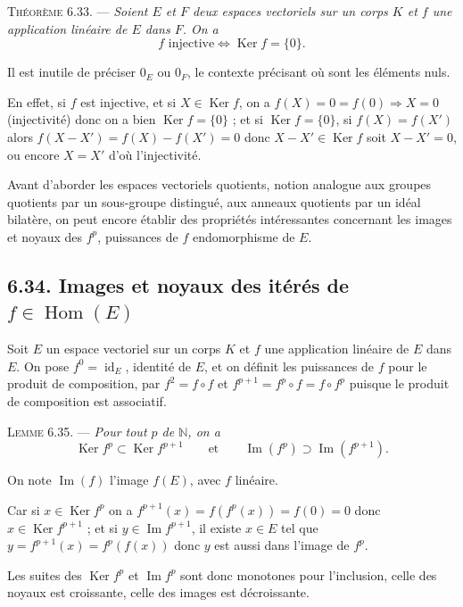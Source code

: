 \medskip\noindent\textsc{Théorème 6.33.} --- \emph{Soient $E$ et $F$ deux espaces vectoriels sur un corps $K$ et $f$ une application linéaire de $E$ dans $F$. On a
\[
f\text{ injective}\Longleftrightarrow\operatorname{Ker}f=\{0\}.
\]}

Il est inutile de préciser $0_E$ ou $0_F$, le contexte précisant où sont les éléments nuls.

En effet, si $f$ est injective, et si $X\in\operatorname{Ker}f$, on a $f(X)=0=f(0)\Rightarrow X=0$ (injectivité) donc on a bien $\operatorname{Ker}f=\{0\}$ ; et si $\operatorname{Ker}f=\{0\}$, si $f(X)=f(X')$ alors $f(X-X')=f(X)-f(X')=0$ donc $X-X'\in\operatorname{Ker}f$ soit $X-X'=0$, ou encore $X=X'$ d'où l'injectivité. \bookend

Avant d'aborder les espaces vectoriels quotients, notion analogue aux groupes quotients par un sous-groupe distingué, aux anneaux quotients par un idéal bilatère, on peut encore établir des propriétés intéressantes concernant les images et noyaux des $f^p$, puissances de $f$ endomorphisme de $E$.

\subsection*{6.34. Images et noyaux des itérés de $f\in\operatorname{Hom}(E)$}

Soit $E$ un espace vectoriel sur un corps $K$ et $f$ une application linéaire de $E$ dans $E$. On pose $f^0=\operatorname{id}_E$, identité de $E$, et on définit les puissances de $f$ pour le produit de composition, par $f^2=f\circ f$ et $f^{p+1}=f^p\circ f=f\circ f^p$ puisque le produit de composition est associatif.

\medskip\noindent\textsc{Lemme 6.35.} --- \emph{Pour tout $p$ de $\mathbb N$, on a
\[
\operatorname{Ker}f^p\subset\operatorname{Ker}f^{p+1}\qquad\text{et}\qquad \operatorname{Im}(f^p)\supset\operatorname{Im}(f^{p+1}).
\]}

On note $\operatorname{Im}(f)$ l'image $f(E)$, avec $f$ linéaire.

Car si $x\in\operatorname{Ker}f^p$ on a $f^{p+1}(x)=f(f^p(x))=f(0)=0$ donc $x\in\operatorname{Ker}f^{p+1}$ ; et si $y\in\operatorname{Im}f^{p+1}$, il existe $x\in E$ tel que $y=f^{p+1}(x)=f^p(f(x))$ donc $y$ est aussi dans l'image de $f^p$.

Les suites des $\operatorname{Ker}f^p$ et $\operatorname{Im}f^p$ sont donc monotones pour l'inclusion, celle des noyaux est croissante, celle des images est décroissante.

